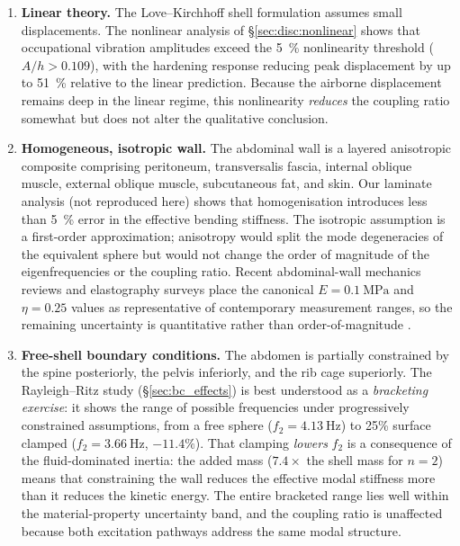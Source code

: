 \begin{enumerate}

  \item \textbf{Linear theory.}  The Love--Kirchhoff shell formulation
    assumes small displacements.  The nonlinear analysis of
    \S\ref{sec:disc:nonlinear} shows that occupational vibration amplitudes
    exceed the \SI{5}{\percent} nonlinearity threshold ($A/h > 0.109$), with
    the hardening response reducing peak displacement by up to
    \SI{51}{\percent} relative to the linear prediction.  Because the airborne
    displacement remains deep in the linear regime, this nonlinearity
    \emph{reduces} the coupling ratio somewhat but does not alter the
    qualitative conclusion.

  \item \textbf{Homogeneous, isotropic wall.}  The abdominal wall is a
    layered anisotropic composite comprising peritoneum, transversalis
    fascia, internal oblique muscle, external oblique muscle, subcutaneous
    fat, and skin.  Our laminate analysis (not reproduced here)
    shows that homogenisation introduces less than \SI{5}{\percent} error in
    the effective bending stiffness.  The isotropic assumption is a
    first-order approximation; anisotropy would split the mode degeneracies
    of the equivalent sphere but would not change the order of magnitude of
    the eigenfrequencies or the coupling ratio.  Recent abdominal-wall
    mechanics reviews and elastography surveys place the canonical
    $E = \SI{0.1}{\mega\pascal}$ and $\eta = 0.25$ values as representative of
    contemporary measurement ranges, so the remaining uncertainty is
    quantitative rather than order-of-magnitude \cite{Deeken2017,Sack2023}.

  \item \textbf{Free-shell boundary conditions.}  The abdomen is partially
    constrained by the spine posteriorly, the pelvis inferiorly, and the
    rib cage superiorly.  The Rayleigh--Ritz study
    (\S\ref{sec:bc_effects}) is best understood as a \emph{bracketing
    exercise}: it shows the range of possible frequencies under
    progressively constrained assumptions, from a free sphere
    ($f_2 = \SI{4.13}{\hertz}$) to 25\% surface clamped
    ($f_2 = \SI{3.66}{\hertz}$, $-11.4\%$).  That clamping
    \emph{lowers} $f_2$ is a consequence of the fluid-dominated inertia:
    the added mass ($7.4\times$ the shell mass for $n=2$) means that
    constraining the wall reduces the effective modal stiffness more than
    it reduces the kinetic energy.  The entire bracketed range lies well
    within the material-property uncertainty band, and the coupling
    ratio is unaffected because both excitation pathways address the same
    modal structure.


\end{enumerate}
